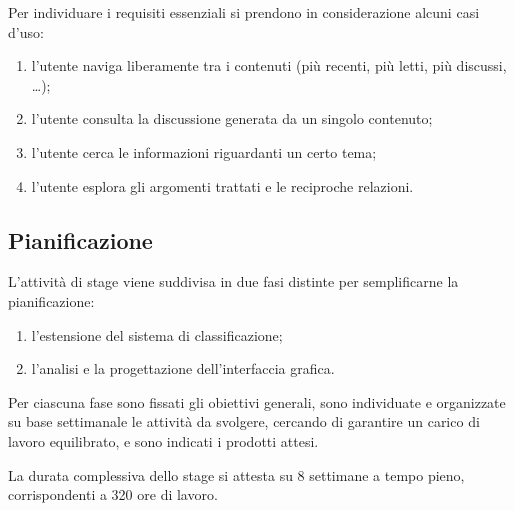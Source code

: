 Per individuare i requisiti essenziali si prendono in considerazione alcuni casi d'uso:
\begin{enumerate}
\item l'utente naviga liberamente tra i contenuti (più recenti, più letti, più discussi, \ldots);
\item l'utente consulta la discussione generata da un singolo contenuto;
\item l'utente cerca le informazioni riguardanti un certo tema;
\item l'utente esplora gli argomenti trattati e le reciproche relazioni.
\end{enumerate}

\subsection{Pianificazione}
L'attività di stage viene suddivisa in due fasi distinte per semplificarne la pianificazione:
\begin{enumerate}
\item l'estensione del sistema di classificazione;
\item l'analisi e la progettazione dell'interfaccia grafica.
\end{enumerate}

Per ciascuna fase sono fissati gli obiettivi generali, sono individuate e organizzate su base settimanale le attività da svolgere, cercando di garantire un carico di lavoro equilibrato, e sono indicati i prodotti attesi.

La durata complessiva dello stage si attesta su 8 settimane a tempo pieno, corrispondenti a 320 ore di lavoro.

